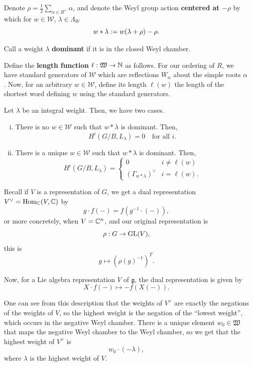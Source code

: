 \documentclass[12pt]{article}
\newcommand{\fg}{\mathfrak{g}}
\newcommand{\fW}{\mathfrak{W}}
\newcommand{\cW}{\mathcal{W}}
\begin{document}
Denote $\rho = \frac{1}{2}\sum_{\alpha\in R^+} \alpha$, and denote the Weyl group action \textbf{centered at $-\rho$} by which for $w\in \cW$, $\lambda\in \Lambda_W$
\[w*\lambda := w(\lambda+\rho) - \rho.\]

Call a weight $\lambda$ \textbf{dominant} if it is in the closed Weyl chamber.

Define the \textbf{length function} $\ell: \fW \to \N$ as follows. For our ordering of $R$, we have standard generators of $\cW$ which are reflections $W_\alpha$ about the simple roots $\alpha$. Now, for an arbitrary $w\in \cW$, define its length $\ell(w)$ the length of the shortest word defining $w$ using the standard generators.

\begin{thm}
    Let $\lambda$ be an integral weight. Then, we have two cases.
    \begin{enumerate}[(i)]
        \item There is no $w\in \cW$ such that $w*\lambda$ is dominant. Then,
        \[H^i(G/B,L_\lambda) = 0 \quad \text{for all $i$}.\]
        \item There is a unique $w\in \cW$ such that $w*\lambda$ is dominant. Then,
        \[H^i(G/B,L_\lambda) = \begin{cases}
            0 & i\neq \ell(w)\\
            (\Gamma_{w*\lambda})^\vee & i=\ell(w).
        \end{cases}\]
    \end{enumerate}
\end{thm}

\begin{rmk}
    Recall if $V$ is a representation of $G$, we get a dual representation $V^\vee = \mathrm{Hom}_{\mathbb{C}}(V,\mathbb{C})$ by
    \[g\cdot f(-) = f(g^{-1}\cdot (-)),\]
    or more concretely, when $V=\mathbb{C}^n$, and our original representation is
    \[\rho: G\to \mathrm{GL}(V),\]
    this is
    \[g \mapsto (\rho(g)^{-1})^T.\]

    Now, for a Lie algebra representation $V$ of $\fg$, the dual representation is given by
    \[X\cdot f(-) \mapsto -f(X(-)).\]

    One can see from this description that the weights of $V^\vee$ are exactly the negations of the weights of $V$, so the highest weight is the negation of the ``lowest weight'', which occurs in the negative Weyl chamber. There is a unique element $w_0\in \fW$ that maps the negative Weyl chamber to the Weyl chamber, so we get that the highest weight of $V^\vee$ is
    \[w_0 \cdot (-\lambda),\]
    where $\lambda$ is the highest weight of $V$.
\end{rmk}
\end{document}
